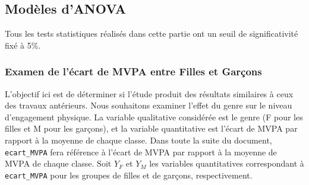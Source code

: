 \documentclass[12pt,a4paper]{article}
\begin{document}
\subsection{Modèles d'ANOVA}
Tous les tests statistiques réalisés dans cette partie ont un seuil de significativité fixé à 5\%.

\subsubsection{Examen de l'écart de MVPA entre Filles et Garçons}
L'objectif ici est de déterminer si l'étude produit des résultats similaires à ceux des travaux antérieurs. Nous souhaitons examiner l'effet du genre sur le niveau d'engagement physique. La variable qualitative considérée est le genre (F pour les filles et M pour les garçons), et la variable quantitative est l'écart de MVPA par rapport à la moyenne de chaque classe. Dans toute la suite du document, \texttt{ecart\_MVPA} fera référence à l'écart de MVPA par rapport à la moyenne de MVPA de chaque classe. Soit $Y_F$ et $Y_M$ les variables quantitatives correspondant à \texttt{ecart\_MVPA} pour les groupes de filles et de garçons, respectivement.\\
\end{document}
